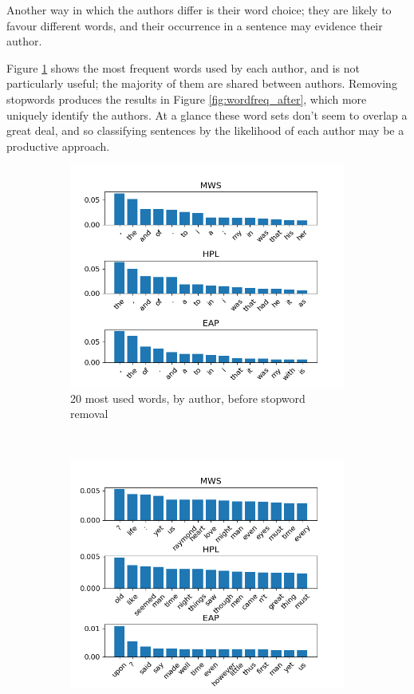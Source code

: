Another way in which the authors differ is their word choice; they are likely to favour different words, and their occurrence in a sentence may evidence their author.

Figure \ref{fig:wordfreq_before} shows the most frequent words used by each author, and is not particularly useful; the majority of them are shared between authors. Removing stopwords produces the results in Figure \ref{fig:wordfreq_after}, which more uniquely identify the authors. At a glance these word sets don't seem to overlap a great deal, and so classifying sentences by the likelihood of each author may be a productive approach.

\begin{figure}[ht]
\centering
\begin{subfigure}[b]{\columnwidth}
\includegraphics[width=\textwidth]{Figures/Data_Structure/wordfreq_before.png}
\caption{20 most used words, by author, before stopword removal}
\label{fig:wordfreq_before}
\end{subfigure} \\
\begin{subfigure}[b]{\columnwidth}
\includegraphics[width=\textwidth]{Figures/Data_Structure/wordfreq_after.png}

\end{subfigure}
\end{figure}
